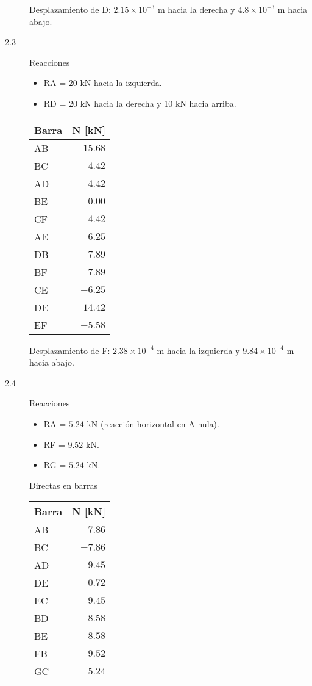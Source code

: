 \begin{description}
Desplazamiento de D: $ 2.15 \times 10^{-3}$ m hacia la derecha y $4.8 \times 10^{-3}$ m hacia abajo.

\item[2.3]

Reacciones
\begin{itemize}
\item RA = 20 kN hacia la izquierda.
\item RD = 20 kN hacia la derecha y 10 kN hacia arriba.
\end{itemize}

\begin{center}
	\begin{tabular}{lr}
		\hline
		Barra & N [kN] \\
		\hline
AB & $15.68$ \\
BC & $4.42$ \\
AD & $-4.42$ \\
BE & $0.00$ \\
CF & $4.42$ \\
AE & $6.25$ \\
DB & $-7.89$ \\
BF & $7.89$ \\
CE & $-6.25$ \\
DE & $-14.42$ \\
EF & $-5.58$ \\
\hline
\end{tabular}
\end{center}

Desplazamiento de F: $2.38 \times 10^{-4}$ m hacia la izquierda y $9.84 \times 10^{-4}$ m hacia abajo.

\item[2.4]

Reacciones
\begin{itemize}
\item RA = $5.24$ kN (reacción horizontal en A nula).
\item RF = $9.52$ kN.
\item RG = $5.24$ kN.
\end{itemize}

Directas en barras

\begin{center}
	\begin{tabular}{lr}
		\hline
		Barra & N [kN] \\
		\hline
AB & $-7.86$ \\
BC & $-7.86$ \\
AD & $9.45$ \\
DE & $0.72$ \\
EC & $9.45$ \\
BD & $8.58$ \\
BE & $8.58$ \\
FB & $9.52$ \\
GC & $5.24$ \\
\hline
\end{tabular}
\end{center}


\end{description}
